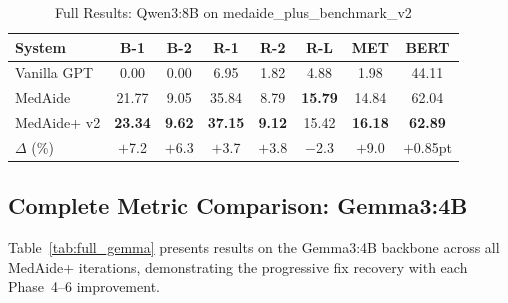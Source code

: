\documentclass[a4paper,12pt]{article}
\begin{document}
\begin{table}[h]
\centering
\caption{Full Results: Qwen3:8B on medaide\_plus\_benchmark\_v2}
\label{tab:full_qwen3}
\renewcommand{\arraystretch}{1.2}
\begin{tabular}{lccccccc}
\toprule
\textbf{System} & \textbf{B-1} & \textbf{B-2} & \textbf{R-1} &
  \textbf{R-2} & \textbf{R-L} & \textbf{MET} & \textbf{BERT} \\
\midrule
Vanilla GPT     & 0.00  & 0.00 & 6.95  & 1.82 & 4.88  & 1.98  & 44.11 \\
MedAide         & 21.77 & 9.05 & 35.84 & 8.79 & \textbf{15.79} & 14.84 & 62.04 \\
MedAide+ v2     & \textbf{23.34} & \textbf{9.62} & \textbf{37.15} &
  \textbf{9.12} & 15.42 & \textbf{16.18} & \textbf{62.89} \\
\midrule
$\Delta$ (\%)   & $+$7.2 & $+$6.3 & $+$3.7 & $+$3.8 & $-$2.3 & $+$9.0 & $+$0.85pt \\
\bottomrule
\end{tabular}
\end{table}

\subsection{Complete Metric Comparison: Gemma3:4B}

Table~\ref{tab:full_gemma} presents results on the Gemma3:4B backbone across all MedAide+ iterations, demonstrating the progressive fix recovery with each Phase~4--6 improvement.
\end{document}

